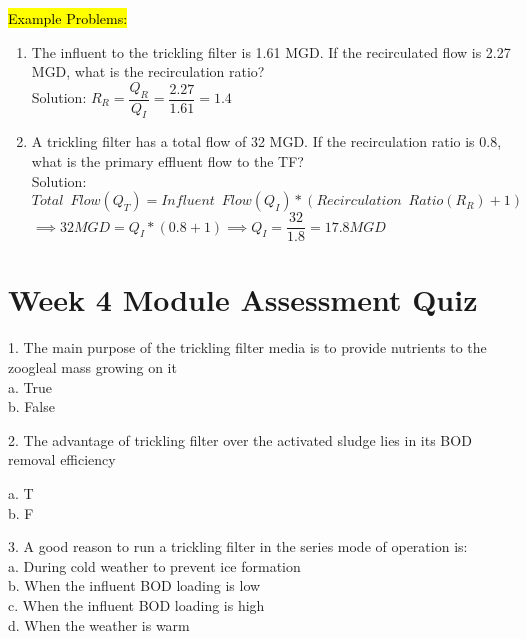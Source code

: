 \hl{Example Problems:}\\
\begin{enumerate}
\item The influent to the trickling filter is 1.61 MGD. If the recirculated flow is 2.27 MGD, what is the recirculation ratio?\\
\vspace{0.2cm}
Solution:  $R_R=\dfrac{Q_R}{Q_I}=\dfrac{2.27}{1.61}=\boxed{1.4}$\\
\vspace{0.2cm}
\item A trickling filter has a total flow of 32 MGD.  If the recirculation ratio is 0.8, what is the primary effluent flow to the TF?\\
\vspace{0.2cm}
Solution:\\
\vspace{0.2cm}
$Total \enspace Flow (Q_T) = Influent \enspace Flow (Q_I)*(Recirculation \enspace Ratio(R_R) +1)$\\
$\implies 32 MGD=Q_I*(0.8+1)\implies Q_I=\dfrac{32}{1.8}=\boxed{17.8 MGD}$
\end{enumerate}
\newpage
{}
\chapter{Week 4 Module Assessment Quiz}

1. The main purpose of the trickling filter media is to provide nutrients to the zoogleal mass growing on it\\

a. True \\
b. False \\
\vspace{0.3cm}

2. The advantage of trickling filter over the activated sludge lies in its BOD removal efficiency 

a. T\\

b. F\\

\vspace{0.3cm}

3. A good reason to run a trickling filter in the series mode of operation is:\\

a. During cold weather to prevent ice formation \\
b. When the influent BOD loading is low \\
c. When the influent BOD loading is high \\
d. When the weather is warm \\


